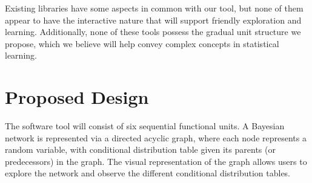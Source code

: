 \documentclass{article}
\newcommand{\comment}[2]{
	\todo[color=GreenYellow,inline]{
		\underline{\textbf{#1:}} #2
	}}
\begin{document}
\begin{enumerate}
    \end{enumerate}

 
    Existing libraries have some aspects in common with our tool, but none of them appear to have the interactive nature that will support friendly exploration and learning. Additionally, none of these tools possess the gradual unit structure we propose, which we believe will help convey complex concepts in statistical learning.
    
    
    \section{Proposed Design}\label{sec:design}
    The software tool will consist of six sequential functional units. A Bayesian network is represented via a directed acyclic graph, where each node represents a random variable, with conditional distribution table given its parents (or predecessors) in the graph. The visual representation of the graph allows users to explore the network and observe the different conditional distribution tables.
    
\end{document}

